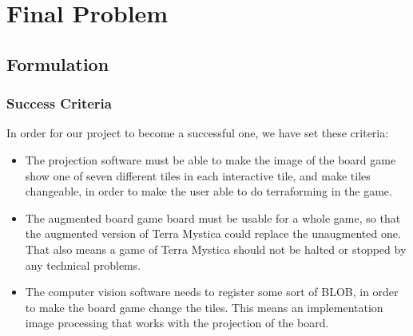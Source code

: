 \chapter{Final Problem}\label{ch:finprob}
\section{Formulation}

\subsection{Success Criteria}
In order for our project to become a successful one, we have set these criteria:
\begin{itemize}
	\item The projection software must be able to make the image of the board game show one of seven different tiles in each interactive tile, and make tiles changeable, in order to make the user able to do terraforming in the game.
	\item The augmented board game board must be usable for a whole game, so that the augmented version of Terra Mystica could replace the unaugmented one. That also means a game of Terra Mystica should not be halted or stopped by any technical problems.
	\item The computer vision software needs to register some sort of BLOB, in order to make the board game change the tiles. This means an implementation image processing that works with the projection of the board.
\end{itemize} 